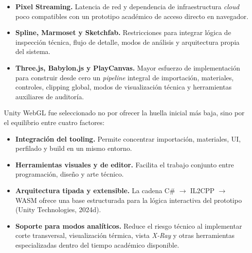 \begin{itemize}
    \item \textbf{Pixel Streaming.} Latencia de red y dependencia de infraestructura \textit{cloud} poco compatibles con un prototipo acad\'emico de acceso directo en navegador.
    \item \textbf{Spline, Marmoset y Sketchfab.} Restricciones para integrar l\'ogica de inspecci\'on t\'ecnica, flujo de detalle, modos de an\'alisis y arquitectura propia del sistema.
    \item \textbf{Three.js, Babylon.js y PlayCanvas.} Mayor esfuerzo de implementaci\'on para construir desde cero un \textit{pipeline} integral de importaci\'on, materiales, controles, clipping global, modos de visualizaci\'on t\'ecnica y herramientas auxiliares de auditor\'ia.
\end{itemize}

Unity WebGL fue seleccionado no por ofrecer la huella inicial m\'as baja, sino por el equilibrio entre cuatro factores:
\begin{itemize}
    \item \textbf{Integraci\'on del tooling.} Permite concentrar importaci\'on, materiales, UI, perfilado y build en un mismo entorno.
    \item \textbf{Herramientas visuales y de editor.} Facilita el trabajo conjunto entre programaci\'on, dise\~no y arte t\'ecnico.
    \item \textbf{Arquitectura tipada y extensible.} La cadena C\# $\rightarrow$ IL2CPP $\rightarrow$ WASM ofrece una base estructurada para la l\'ogica interactiva del prototipo (Unity Technologies, 2024d).
    \item \textbf{Soporte para modos anal\'iticos.} Reduce el riesgo t\'ecnico al implementar corte transversal, visualizaci\'on t\'ermica, vista \textit{X-Ray} y otras herramientas especializadas dentro del tiempo acad\'emico disponible.
\end{itemize}

\newpage
